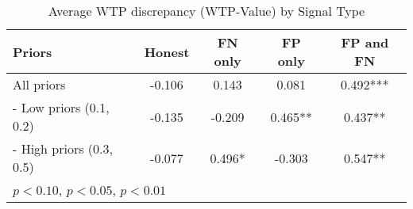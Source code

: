 \begin{table}[H]\centering \caption{Average WTP discrepancy (WTP-Value) by Signal Type} \label{tab:WTP_nonpar}
\begin{tabular}{lcccc} 
\hline \hline
\textbf{Priors}&\textbf{Honest}&\textbf{FN only}& \textbf{FP only} & \textbf{FP and FN}\\ \hline
All priors&-0.106&0.143&0.081&0.492***\\
\hspace{3pt}- Low priors (0.1, 0.2)&-0.135&-0.209&0.465**&0.437**\\
\hspace{3pt}- High priors (0.3, 0.5)&-0.077&0.496*&-0.303&0.547**\\
\hline
\multicolumn{5}{l}{\footnotesize \sym{*} \(p<0.10\), \sym{**} \(p<0.05\), \sym{***} \(p<0.01\)}\\
\end{tabular} \end{table}
